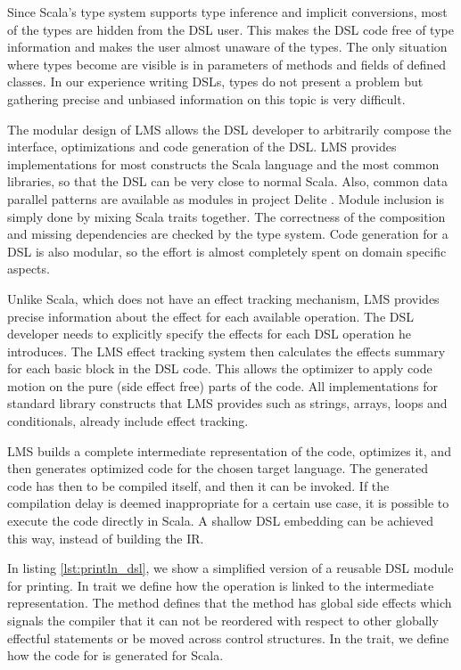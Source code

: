 Since Scala's type system supports type inference and implicit conversions, most of the  types are hidden from the DSL user. This makes the DSL code free of type information and makes the user almost unaware of the  types. The only situation where  types become are visible is in parameters of methods and fields of defined classes. In our experience writing DSLs,  types do not present a problem but gathering precise and unbiased information on this topic is very difficult.  

The modular design of LMS allows the DSL developer to arbitrarily compose the interface, optimizations and code generation of the DSL. LMS provides implementations for most constructs the Scala language and the most common libraries, so that the DSL can be very close to normal Scala. Also, common data parallel patterns are available as modules in project Delite \cite{dsl11}. Module inclusion is simply done by mixing Scala traits together. The correctness of the composition and missing dependencies are checked by the type system. Code generation for a DSL is also modular, so the effort is almost completely spent on domain specific aspects.

Unlike Scala, which does not have an effect tracking mechanism, LMS provides precise information about the effect for each available operation. The DSL developer needs to explicitly specify the effects for each DSL operation he introduces. The LMS effect tracking system then calculates the effects summary for each basic block in the DSL code. This allows the optimizer to apply code motion on the pure (side effect free) parts of the code. All implementations for standard library constructs that LMS provides such as strings, arrays, loops and conditionals, already include effect tracking.

LMS builds a complete intermediate representation of the code, optimizes it, and then generates optimized code for the chosen target language. The generated code has then to be compiled itself, and then it can be invoked. If the compilation delay is deemed inappropriate for a certain use case, it is possible to execute the code directly in Scala. A shallow DSL embedding can be achieved this way, instead of building the IR.
 
In listing \ref{lst:println_dsl}, we show a simplified version of a reusable DSL module for printing. In trait  we define how the  operation is linked to the intermediate representation. The  method defines that the  method has global side effects which signals the compiler that it can not be reordered with respect to other globally effectful statements or be moved across control structures. In the  trait, we define how the code for  is generated for Scala. 

